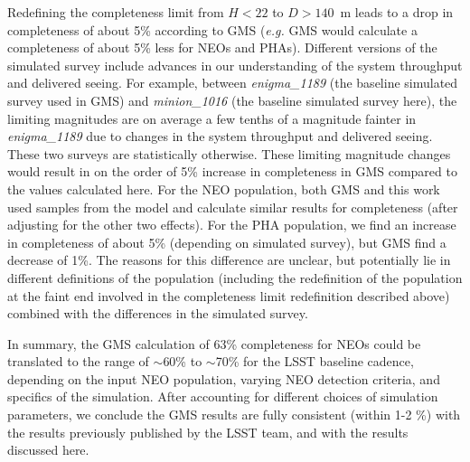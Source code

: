 Redefining the completeness limit from $H<22$ to $D>140$~m leads to a drop in completeness of about 5\% according to GMS ({\it e.g.} GMS would calculate a completeness of about 5\% less for NEOs and PHAs). 
Different versions of the simulated survey include advances in our understanding of the system throughput and delivered seeing. For example, between {\it enigma\_1189} (the baseline simulated survey used in GMS) and {\it minion\_1016} (the baseline simulated survey here), the limiting magnitudes are on average a few tenths of a magnitude fainter in {\it enigma\_1189} due to changes in the system throughput and delivered seeing. These two surveys are statistically otherwise. These limiting magnitude changes would result in on the order of 5\% increase in completeness in GMS compared to the values calculated here.
For the NEO population, both GMS and this work used samples from the \cite{Grav2011} model and calculate similar results for completeness (after adjusting for the other two effects). For the PHA population, we find an increase in completeness of about 5\% (depending on simulated survey), but GMS find a decrease of 1\%. The reasons for this difference are unclear, but potentially lie in different definitions of the population (including the redefinition of the population at the faint end involved in the completeness limit redefinition described above) combined with the differences in the simulated survey.

In summary, the GMS calculation of 63\% completeness for NEOs could be translated to the range of $\sim$60\% to 
$\sim$70\% for the LSST baseline cadence,  depending on the input NEO population, varying NEO detection criteria, 
and specifics of the simulation.  After accounting for different choices of simulation parameters, we conclude the 
GMS results are fully consistent (within 1-2 \%) with the results previously published by the LSST team, and with the 
results discussed here.
